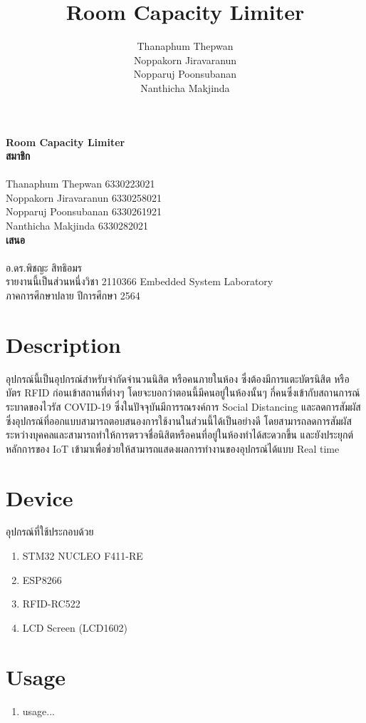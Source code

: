 \documentclass[fontsize=14pt]{extarticle}
\date{}
\title{\huge\textbf{Room Capacity Limiter}}
\author{Thanaphum Thepwan\\ Noppakorn Jiravaranun\\ Nopparuj Poonsubanan\\ Nanthicha Makjinda}
\begin{document}
\begin{center}
    \textbf{\Huge Room Capacity Limiter\\}
    \vspace*{\fill}
    {
        \LARGE
        \textbf{สมาชิก}\\~\\
        Thanaphum Thepwan 6330223021\\
        Noppakorn Jiravaranun 6330258021\\
        Nopparuj Poonsubanan 6330261921\\
        Nanthicha Makjinda 6330282021\\
        \vspace*{\fill}
        \textbf{เสนอ}\\~\\
        อ.ดร.พิชญะ สิทธิอมร\\
        \vspace*{\fill}
        รายงานนี้เป็นส่วนหนึ่งวิชา 2110366 Embedded System Laboratory\\
        ภาคการศึกษาปลาย ปีการศึกษา 2564
    }
\end{center}
\pagebreak
\tableofcontents
\pagebreak
\section{Description}
อุปกรณ์นี้เป็นอุปกรณ์สำหรับจำกัดจำนวนนิสิต หรือคนภายในห้อง ซึ่งต้องมีการแตะบัตรนิสิต หรือบัตร RFID ก่อนเข้าสถานที่ต่างๆ
โดยจะบอกว่าตอนนี้มีคนอยู่ในห้องนั้นๆ กี่คนซึ่งเข้ากับสถานการณ์ระบาดของไวรัส COVID-19
ซึ่งในปัจจุบันมีการรณรงค์การ Social Distancing และลดการสัมผัสซึ่งอุปกรณ์ที่ออกแบบสามารถตอบสนองการใช้งานในส่วนนี้ได้เป็นอย่างดี
โดยสามารถลดการสัมผัสระหว่างบุคคลและสามารถทำให้การตรวจชื่อนิสิตหรือคนที่อยู่ในห้องทำได้สะดวกขึ้น และยังประยุกต์หลักการของ IoT
เข้ามาเพื่อช่วยให้สามารถแสดงผลการทํางานของอุปกรณ์ได้แบบ Real time
\section{Device}
อุปกรณ์ที่ใช้ประกอบด้วย\\
\begin{enumerate}
    \item STM32 NUCLEO F411-RE
    \item ESP8266
    \item RFID-RC522
    \item LCD Screen (LCD1602)
\end{enumerate}
\section{Usage}
\begin{enumerate}
    \item usage...
\end{enumerate}
\end{document}
